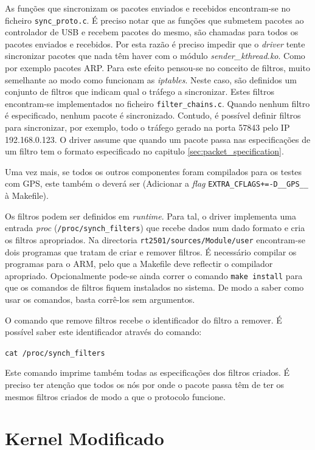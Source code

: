 \documentclass[10pt,a4paper,oneside]{book}
\begin{document}
As funções que sincronizam os pacotes enviados e recebidos encontram-se no ficheiro {\tt sync\_proto.c}. É preciso notar que as funções que submetem pacotes ao controlador de USB e recebem pacotes do mesmo, são chamadas para todos os pacotes enviados e recebidos. Por esta razão é preciso impedir que o \emph{driver} tente sincronizar pacotes que nada têm haver com o módulo \emph{sender\_kthread.ko}. Como por exemplo pacotes ARP. Para este efeito pensou-se no conceito de filtros, muito semelhante ao modo como funcionam as \emph{iptables}. Neste caso, são definidos um conjunto de filtros que indicam qual o tráfego a sincronizar. Estes filtros encontram-se implementados no ficheiro {\tt filter\_chains.c}. Quando nenhum filtro é especificado, nenhum pacote é sincronizado. Contudo, é possível definir filtros para sincronizar, por exemplo, todo o tráfego gerado na porta 57843 pelo IP 192.168.0.123. O driver assume que quando um pacote passa nas especificações de um filtro tem o formato especificado no capitulo \ref{sec:packet_specification}.

Uma vez mais, se todos os outros componentes foram compilados para os testes com GPS, este também o deverá ser (Adicionar a \emph{flag} {\tt EXTRA\_CFLAGS+=-D\_\_GPS\_\_} à Makefile).

Os filtros podem ser definidos em \emph{runtime}. Para tal, o driver implementa uma entrada \emph{proc} ({\tt /proc/synch\_filters}) que recebe dados num dado formato e cria os filtros apropriados. Na directoria {\tt rt2501/sources/Module/user} encontram-se dois programas que tratam de criar e remover filtros. É necessário compilar os programas para o ARM, pelo que a Makefile deve reflectir o compilador apropriado. Opcionalmente pode-se ainda correr o comando {\tt make install} para que os comandos de filtros fiquem instalados no sistema. De modo a saber como usar os comandos, basta corrê-los sem argumentos.

O comando que remove filtros recebe o identificador do filtro a remover. É possível saber este identificador através do comando:

\begin{flushleft}
  {\tt cat /proc/synch\_filters}
\end{flushleft}

Este comando imprime também todas as especificações dos filtros criados. É preciso ter atenção que todos os nós por onde o pacote passa têm de ter os mesmos filtros criados de modo a que o protocolo funcione.

\section{Kernel Modificado}\label{sec:kernel}
\end{document}
